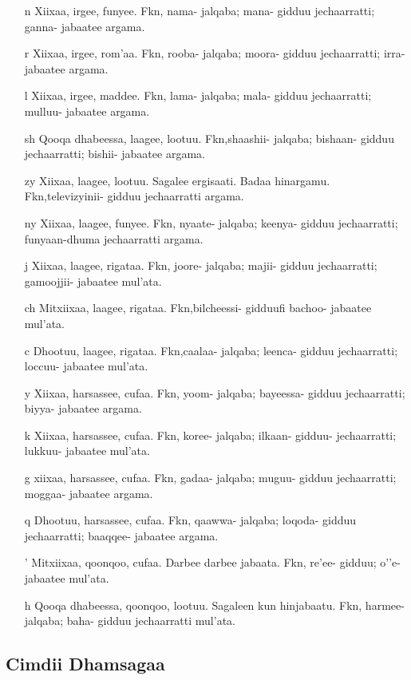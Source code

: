 \documentclass[11pt,b5paper]{book}
\begin{document}
\begin{itemize}
  \item[n] Xiixaa, irgee, funyee. Fkn, nama- jalqaba; mana- gidduu jechaarratti; ganna- jabaatee argama.
  \item[r] Xiixaa, irgee, rom’aa. Fkn, rooba- jalqaba; moora- gidduu jechaarratti; irra- jabaatee argama.
  \item[l] Xiixaa, irgee, maddee. Fkn, lama- jalqaba; mala- gidduu jechaarratti; mulluu- jabaatee argama.
  \item[sh] Qooqa dhabeessa, laagee, lootuu. Fkn,shaashii- jalqaba; bishaan- gidduu jechaarratti; bishii- jabaatee argama.
  \item[zy] Xiixaa, laagee, lootuu. Sagalee ergisaati. Badaa  hinargamu. Fkn,televizyinii- gidduu jechaarratti argama.
  \item[ny] Xiixaa, laagee, funyee. Fkn, nyaate- jalqaba; keenya- gidduu jechaarratti; funyaan-dhuma jechaarratti argama. 
  \item[j] Xiixaa, laagee, rigataa. Fkn, joore- jalqaba; majii- gidduu jechaarratti; gamoojjii- jabaatee mul'ata.
  \item[ch] Mitxiixaa, laagee, rigataa. Fkn,bilcheessi- gidduufi bachoo- jabaatee mul'ata.
  \item[c] Dhootuu, laagee, rigataa. Fkn,caalaa- jalqaba; leenca- gidduu jechaarratti; loccuu- jabaatee mul'ata.
  \item[y] Xiixaa, harsassee, cufaa. Fkn, yoom- jalqaba; bayeessa- gidduu jechaarratti; biyya- jabaatee argama.
  \item[k] Xiixaa, harsassee, cufaa. Fkn, koree- jalqaba; ilkaan- gidduu- jechaarratti; lukkuu- jabaatee mul'ata.
  \item[g] xiixaa, harsassee, cufaa. Fkn, gadaa- jalqaba; muguu- gidduu jechaarratti; moggaa- jabaatee argama.
  \item[q] Dhootuu, harsassee, cufaa. Fkn, qaawwa- jalqaba; loqoda- gidduu jechaarratti; baaqqee- jabaatee argama.
  \item[’] Mitxiixaa, qoonqoo, cufaa. Darbee darbee  jabaata. Fkn, re'ee- gidduu; o’’e- jabaatee mul'ata.
  \item[h] Qooqa dhabeessa, qoonqoo, lootuu. Sagaleen kun  hinjabaatu. Fkn, harmee- jalqaba; baha- gidduu jechaarratti mul'ata.  
\end{itemize}

  \subsection{Cimdii Dhamsagaa}
  
\end{document}
